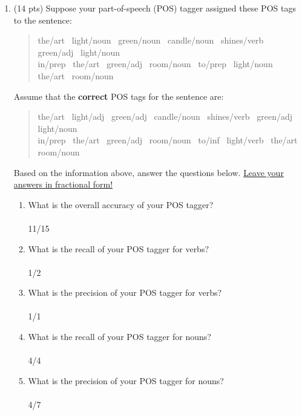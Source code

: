 \documentclass[11pt]{article}
\begin{document}
\begin{enumerate}
\newpage
\item (14 pts) Suppose your part-of-speech (POS) tagger assigned these
  POS tags to the sentence: 

\begin{quote}
the/{\sc art~}  light/{\sc noun~}  green/{\sc noun~} 
  candle/{\sc noun~}  shines/{\sc verb~}  green/{\sc adj~}
 light/{\sc noun~} \\  in/{\sc prep~}  the/{\sc art~} 
  green/{\sc adj~}  room/{\sc noun~}  to/{\sc prep~} 
  light/{\sc noun~}  the/{\sc art~}  room/{\sc noun~}
\end{quote}

Assume that the {\bf correct} POS tags for the sentence are:

\begin{quote}
the/{\sc art~}  light/{\sc adj~}  green/{\sc adj~} 
  candle/{\sc noun~}  shines/{\sc verb~}  green/{\sc adj~}
 light/{\sc noun~} \\  in/{\sc prep~}  the/{\sc art~} 
  green/{\sc adj~}  room/{\sc noun~}  to/{\sc inf~} 
  light/{\sc verb~}  the/{\sc art~}  room/{\sc noun~}
\end{quote}

Based on the information above, answer the questions
below. \underline{Leave your answers in fractional form!} 

\begin{enumerate}

\item What is the overall accuracy of your POS tagger?\\ ~ \\
11/15\\

\item What is the recall of your POS tagger for verbs?\\ ~ \\
1/2\\
\item What is the precision of your POS tagger for verbs? \\ ~ \\
1/1\\
\item What is the recall of your POS tagger for nouns?\\ ~ \\
4/4\\
\item What is the precision of your POS tagger for nouns?\\ ~ \\
4/7\\


\end{enumerate}
\end{enumerate}
\end{document}
